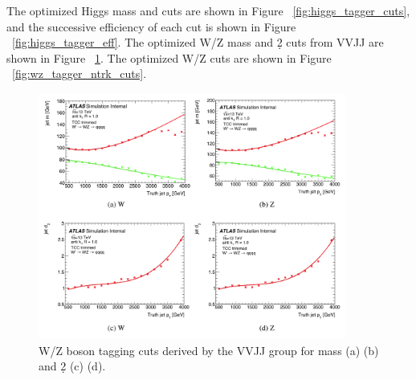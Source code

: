 The optimized Higgs mass and \ntrk cuts are shown in Figure ~\ref{fig:higgs_tagger_cuts}, and the successive efficiency of each cut is shown in Figure ~\ref{fig:higgs_tagger_eff}.
The optimized W/Z mass and \d2 cuts from VVJJ are shown in Figure ~\ref{fig:vvjj_wz_tagger_mass_d2_cuts}.
The optimized W/Z \ntrk cuts are shown in Figure ~\ref{fig:wz_tagger_ntrk_cuts}.

\begin{figure}[htbp!]
\begin{center}
    \includegraphics[width=0.9\textwidth]{VVJJ_Mass_d2_WZ_cuts.png}
\end{center}
\caption{W/Z boson tagging cuts derived by the VVJJ group for mass (a) (b) and \d2 (c) (d).}
\label{fig:vvjj_wz_tagger_mass_d2_cuts}
\end{figure}

